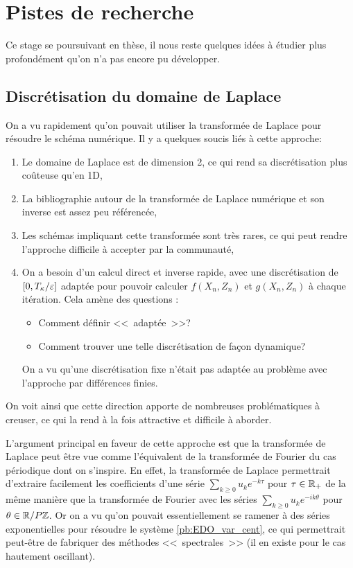 \section{Pistes de recherche}

Ce stage se poursuivant en thèse, il nous reste quelques idées à étudier plus profondément qu'on n'a pas encore pu développer. 

\subsection{Discrétisation du domaine de Laplace}

On a vu rapidement qu'on pouvait utiliser la transformée de Laplace pour résoudre le schéma numérique. Il y a quelques soucis liés à cette approche:
\begin{enumerate}
\item Le domaine de Laplace est de dimension 2, ce qui rend sa discrétisation plus coûteuse qu'en 1D,
\item La bibliographie autour de la transformée de Laplace numérique et son inverse est assez peu référencée, 
\item Les schémas impliquant cette transformée sont très rares, ce qui peut rendre l'approche difficile à accepter par la communauté, 
\item On a besoin d'un calcul direct et inverse rapide, avec une discrétisation de $[0,T_{\kappa}/\varepsilon]$ adaptée pour pouvoir calculer $f(X_n,Z_n)$ et $g(X_n,Z_n)$ à chaque itération. Cela amène des questions : 
\begin{itemize}
\item Comment définir <<~adaptée~>>? 
\item Comment trouver une telle discrétisation de façon dynamique? 
\end{itemize} 
On a vu qu'une discrétisation fixe n'était pas adaptée au problème avec l'approche par différences finies.
\end{enumerate}
On voit ainsi que cette direction apporte de nombreuses problématiques à creuser, ce qui la rend à la fois attractive et difficile à aborder. 

L'argument principal en faveur de cette approche est que la transformée de Laplace peut être vue comme l'équivalent de la transformée de Fourier du cas périodique dont on s'inspire. 
En effet, la transformée de Laplace permettrait d'extraire facilement les coefficients d'une série $\sum_{k\geq 0} u_k e^{-k\tau}$ pour $\tau\in\mathbb{R}_+$ de la même manière que la transformée de Fourier avec les séries $\sum_{k\geq 0} u_k e^{-ik\theta}$ pour $\theta\in\mathbb{R}/P\mathbb{Z}$. 
Or on a vu qu'on pouvait essentiellement se ramener à des séries exponentielles pour résoudre le système \eqref{pb:EDO_var_cent}, ce qui permettrait peut-être de fabriquer des méthodes <<~spectrales~>> (il en existe pour le cas hautement oscillant). 


